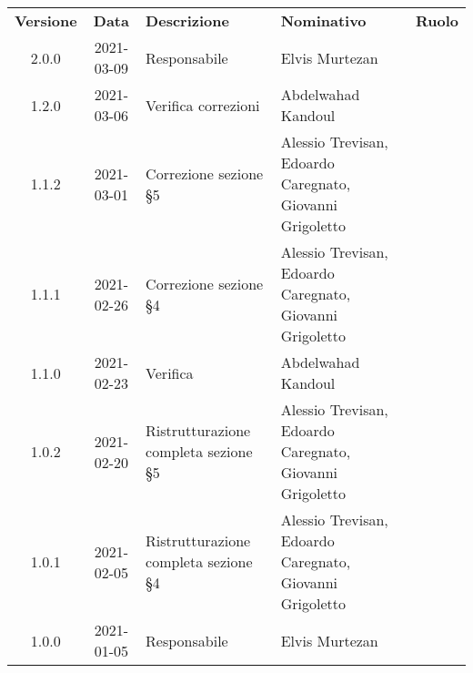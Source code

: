 
{
\renewcommand{\arraystretch}{1.5}
\centering
\begin{longtable}{ c c  C{3.5cm}  C{4cm}  c }
    \rowcolor{\primaryColor}
    \textcolor{\secondaryColor}{
    \textbf{Versione}}     & \textcolor{\secondaryColor}{\textbf{Data}}       & \textcolor{\secondaryColor}
    {\textbf{Descrizione}} & \textcolor{\secondaryColor}{\textbf{Nominativo}} & \textcolor{\secondaryColor}{\textbf{Ruolo}}                                                                         \\


    2.0.0                  & 2021-03-09                                       & Responsabile                                & Elvis Murtezan                                      & \responsabile{} \\
    1.2.0                  & 2021-03-06                                        & Verifica correzioni                              & Abdelwahad Kandoul & \verificatore{}    \\
    1.1.2                  & 2021-03-01                                       & Correzione sezione §5                              & Alessio Trevisan, Edoardo Caregnato, Giovanni Grigoletto & \analista{}    \\
    1.1.1                  & 2021-02-26                                      & Correzione sezione §4                          & Alessio Trevisan, Edoardo Caregnato, Giovanni Grigoletto & \analista{}    \\
    1.1.0                  & 2021-02-23                                      & Verifica                                    & Abdelwahad Kandoul                & \verificatore{} \\
    1.0.2                  & 2021-02-20                                        & Ristrutturazione completa sezione §5                              & Alessio Trevisan, Edoardo Caregnato, Giovanni Grigoletto & \analista{}    \\
    1.0.1                  & 2021-02-05                                      & Ristrutturazione completa sezione §4                          & Alessio Trevisan, Edoardo Caregnato, Giovanni Grigoletto & \analista{}    \\
    1.0.0                  & 2021-01-05                                       & Responsabile                                & Elvis Murtezan                                      & \responsabile{} \\

\end{longtable}}
